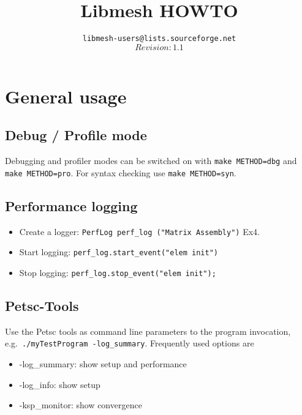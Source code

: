 \documentclass{article}
\newcommand{\exmp}[1]{\textsf{Ex#1}}
\newcommand{\code}[1]{\texttt{#1}}
\begin{document}
\lstset{language=C++}


\title{Libmesh HOWTO}
\author{\texttt{libmesh-users@lists.sourceforge.net} \\
        $$Revision: 1.1 $$}
\maketitle

\section{General usage}
\label{sec:usage-tips}

\subsection{Debug / Profile mode}
\label{sec:debug-profile}

Debugging and profiler modes can be switched on with \code{make METHOD=dbg}
and \code{make METHOD=pro}.  For syntax checking use \code{make METHOD=syn}.

\subsection{Performance logging}
\label{sec:performance-logging}

\begin{itemize}
\item Create a logger: \code{PerfLog perf\_log ("Matrix Assembly")} \exmp{4}.
\item Start logging: \code{perf\_log.start\_event("elem init")}
\item Stop logging: \code{perf\_log.stop\_event("elem init");}
\end{itemize}

\subsection{Petsc-Tools}
\label{sec:petsc-tools}

Use the Petsc tools as command line parameters to the program invocation,
e.g.~\code{./myTestProgram -log\_summary}. Frequently used options are

\begin{itemize}
\item -log\_summary: show setup and performance
\item -log\_info: show setup
\item -ksp\_monitor: show convergence
\end{itemize}
\end{document}
